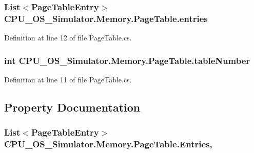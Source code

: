\subsubsection[{entries}]{\setlength{\rightskip}{0pt plus 5cm}List$<${\bf Page\+Table\+Entry}$>$ C\+P\+U\+\_\+\+O\+S\+\_\+\+Simulator.\+Memory.\+Page\+Table.\+entries\hspace{0.3cm}{\ttfamily [private]}}\label{class_c_p_u___o_s___simulator_1_1_memory_1_1_page_table_afaec11faaccf2f772fa8d5c52cfcf9ad}


Definition at line 12 of file Page\+Table.\+cs.

\hypertarget{class_c_p_u___o_s___simulator_1_1_memory_1_1_page_table_aef0b423d8ee9ee97104aba03cef1a584}{}
\subsubsection[{table\+Number}]{\setlength{\rightskip}{0pt plus 5cm}int C\+P\+U\+\_\+\+O\+S\+\_\+\+Simulator.\+Memory.\+Page\+Table.\+table\+Number\hspace{0.3cm}{\ttfamily [private]}}\label{class_c_p_u___o_s___simulator_1_1_memory_1_1_page_table_aef0b423d8ee9ee97104aba03cef1a584}


Definition at line 11 of file Page\+Table.\+cs.



\subsection{Property Documentation}
\hypertarget{class_c_p_u___o_s___simulator_1_1_memory_1_1_page_table_a39686465a9c618e73a0a2d8f316ffa2c}{}
\subsubsection[{Entries}]{\setlength{\rightskip}{0pt plus 5cm}List$<${\bf Page\+Table\+Entry}$>$ C\+P\+U\+\_\+\+O\+S\+\_\+\+Simulator.\+Memory.\+Page\+Table.\+Entries\hspace{0.3cm}{\ttfamily [get]}, {\ttfamily [set]}}\label{class_c_p_u___o_s___simulator_1_1_memory_1_1_page_table_a39686465a9c618e73a0a2d8f316ffa2c}



